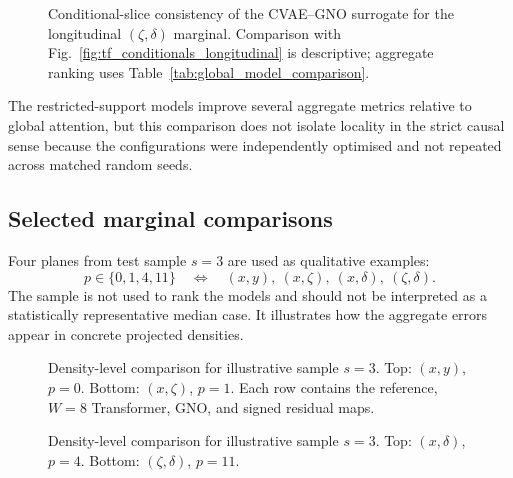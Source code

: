 \begin{figure}[H]
    \centering
    \caption{Conditional-slice consistency of the CVAE--GNO surrogate for the longitudinal $(\zeta,\delta)$ marginal. Comparison with Fig.~\ref{fig:tf_conditionals_longitudinal} is descriptive; aggregate ranking uses Table~\ref{tab:global_model_comparison}.}
    \label{fig:gno_conditionals_longitudinal}
\end{figure}

The restricted-support models improve several aggregate metrics relative to global attention, but this comparison does not isolate locality in the strict causal sense because the configurations were independently optimised and not repeated across matched random seeds.

\subsection{Selected marginal comparisons}
\label{subsec:results_tf_gno_comparison}

Four planes from test sample $s=3$ are used as qualitative examples:
\begin{equation}
    p\in\{0,1,4,11\}
    \quad\Longleftrightarrow\quad
    (x,y),\ (x,\zeta),\ (x,\delta),\ (\zeta,\delta).
    \label{eq:selected_pair_indices_results}
\end{equation}
The sample is not used to rank the models and should not be interpreted as a statistically representative median case. It illustrates how the aggregate errors appear in concrete projected densities.

\begin{figure}[p]
    \centering
    \vspace{0.7em}
    \caption{Density-level comparison for illustrative sample $s=3$. Top: $(x,y)$, $p=0$. Bottom: $(x,\zeta)$, $p=1$. Each row contains the reference, $W=8$ Transformer, GNO, and signed residual maps.}
    \label{fig:tf_gno_comparison_xy_xzeta}
\end{figure}

\begin{figure}[p]
    \centering
    \vspace{0.7em}
    \caption{Density-level comparison for illustrative sample $s=3$. Top: $(x,\delta)$, $p=4$. Bottom: $(\zeta,\delta)$, $p=11$.}
    \label{fig:tf_gno_comparison_xdelta_longitudinal}
\end{figure}


